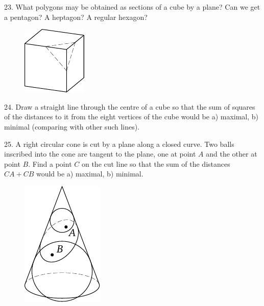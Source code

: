 \begin{problem}{23.}
	What polygons may be obtained as sections of a cube by a plane? Can we get a pentagon? A heptagon?
	A regular hexagon?
	\begin{figure}
		\includegraphics{taskbook-7}
	\end{figure}
\end{problem}

\begin{problem}{24.}
	Draw a straight line through the centre of a cube so that the sum of squares of the distances to it
	from the eight vertices of the cube would be
	a) maximal,
	b) minimal (comparing with other such lines).
\end{problem}

\begin{problem}{25.}
	A right circular cone is cut by a plane along a closed curve. Two balls inscribed into the cone
	are tangent to the plane, one at point $A$ and the other at point $B$. Find a point $C$ on the cut line so
	that the sum of the distances $CA + CB$ would be a) maximal, b) minimal.
	\begin{figure}
		\includegraphics{taskbook-9}
	\end{figure}
\end{problem}


